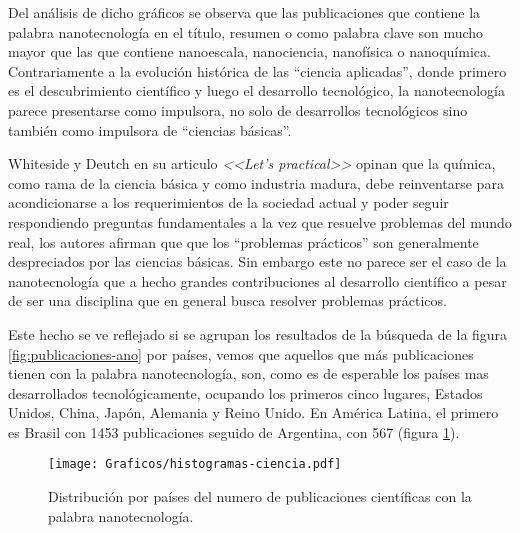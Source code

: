 	Del análisis de dicho gráficos se observa que las publicaciones que contiene la palabra nanotecnología en el título, resumen o como palabra clave son mucho mayor que las que contiene nanoescala, nanociencia, nanofísica o nanoquímica. Contrariamente a la evolución histórica de las ``ciencia aplicadas'', donde primero es el descubrimiento científico y luego el desarrollo tecnológico, la nanotecnología parece presentarse como impulsora, no solo de desarrollos tecnológicos sino también como impulsora de ``ciencias básicas''.

	Whiteside y Deutch en su articulo \textit{<<Let's practical>>} opinan que la química, como rama de la ciencia básica y como industria madura, debe reinventarse para acondicionarse a los requerimientos de la sociedad actual y poder seguir respondiendo preguntas fundamentales a la vez que resuelve problemas del mundo real, los autores afirman que que los ``problemas prácticos'' son generalmente despreciados por las ciencias básicas. \cite{Burdass2010} Sin embargo este no parece ser el caso de la nanotecnología que a hecho grandes contribuciones al desarrollo científico a pesar de ser una disciplina que en general busca resolver problemas prácticos.
	
	Este hecho se ve reflejado si se agrupan los resultados de la búsqueda de la figura \ref{fig:publicaciones-ano} por países, vemos que aquellos que más publicaciones tienen con la palabra nanotecnología, son, como es de esperable los países mas desarrollados tecnológicamente, ocupando los primeros cinco lugares, Estados Unidos, China, Japón, Alemania y Reino Unido. En América Latina, el primero es Brasil con 1453 publicaciones seguido de Argentina, con 567 (figura \ref{fig:paises}).

			\begin{figure}[ht!]
 			\begin{center}
 			\texttt{[image: Graficos/histogramas-ciencia.pdf]}
 			\caption[Nanotecnología por países]{Distribución por países del numero de publicaciones científicas con la palabra nanotecnología.}
 			\label{fig:paises}
 		    \end{center}
 		    \end{figure}

